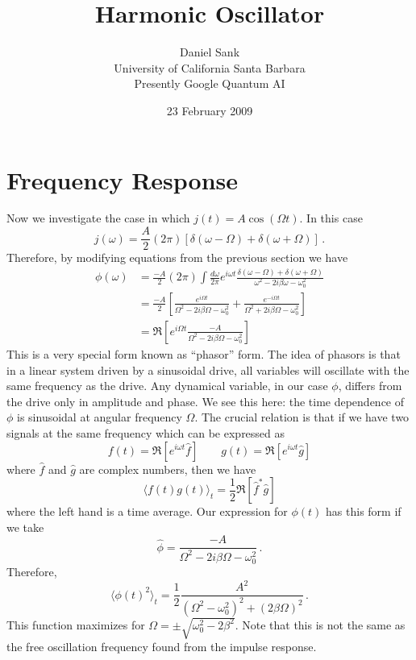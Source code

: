 \documentclass{article}
\title{Harmonic Oscillator}
\author{Daniel Sank \\ \small{University of California Santa Barbara} \\ \small{Presently Google Quantum AI}}
\date{23 February 2009}
\begin{document}
\maketitle



\section{Frequency Response}

Now we investigate the case in which $j(t)=A\cos(\Omega t)$.
In this case
\begin{equation}
j(\omega)=\frac{A}{2}(2\pi)\left[\delta(\omega-\Omega)+\delta(\omega+\Omega)\right] \, .
\end{equation}
Therefore, by modifying equations from the previous section we have
\begin{align}
\phi(\omega)
& = \frac{-A}{2}(2\pi) \int \frac{d\omega}{2\pi} e^{i \omega t} \frac{\delta(\omega-\Omega)+\delta(\omega+\Omega)}{\omega^{2} - 2i\beta\omega - \omega_0^2} \\
& =
\frac{-A}{2}
\left[
\frac{e^{i \Omega t}}{\Omega^{2} - 2i\beta\Omega - \omega_0^2} +
\frac{e^{-i \Omega t}}{\Omega^2 + 2i\beta\Omega - \omega_0^2}
\right] \\
&= \Re \left[ e^{i \Omega t} \frac{-A}{\Omega^2 - 2i\beta\Omega - \omega_0^2}
\right] \label{eq:phasor_form}
\end{align}
This is a very special form known as {}``phasor'' form.
The idea of phasors is that in a linear system driven by a sinusoidal drive, all variables will oscillate with the same frequency as the drive.
Any dynamical variable, in our case $\phi$, differs from the drive only in amplitude and phase.
We see this here: the time dependence of $\phi$ is sinusoidal at angular frequency $\Omega$.
The crucial relation is that if we have two signals at the same frequency which can be expressed as \begin{equation}
f(t) = \Re[ e^{i\omega t} \hat{f}] \qquad
g(t) = \Re[ e^{i\omega t} \hat{g}]
\end{equation}
where $\hat{f}$ and $\hat{g}$ are complex numbers, then we have \begin{equation}
\langle f(t)g(t)\rangle_{t}=\frac{1}{2}\Re[\hat{f}^{*}\hat{g}] \end{equation}
where the left hand is a time average.
Our expression for $\phi(t)$ has this form if we take
\begin{equation}
\hat{\phi} = \frac{-A}{\Omega^{2} - 2i\beta\Omega - \omega_0^2} \, .
\end{equation}
Therefore, \begin{equation}
  \langle\phi(t)^{2}\rangle_{t}
  = \frac{1}{2} \frac{A^{2}}{(\Omega^{2}-\omega_0^{2})^{2}+(2\beta\Omega)^2}
  \, .
\end{equation}
This function maximizes for $\Omega=\pm\sqrt{\omega_{0}^{2}-2\beta^{2}}$.
Note that this is not the same as the free oscillation frequency found from the impulse response.
\end{document}
